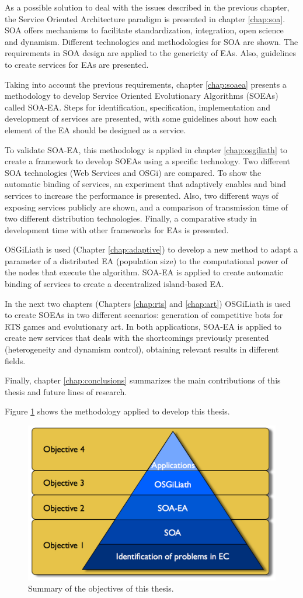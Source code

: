  As a possible solution to deal with the issues described in the previous chapter, the Service Oriented Architecture paradigm is presented in chapter \ref{chap:soa}. SOA  offers mechanisms to facilitate standardization, integration, open science and dynamism. Different technologies and methodologies for SOA are shown. The requirements in SOA design are applied to the genericity of EAs. Also, guidelines to create services for EAs are presented.

Taking into account the previous requirements, chapter \ref{chap:soaea} presents a methodology to develop Service Oriented Evolutionary Algorithms (SOEAs) called SOA-EA. Steps for identification, specification, implementation and development of services are presented, with some guidelines about how each element of the EA should be designed as a service.

To validate SOA-EA, this methodology is applied in chapter \ref{chap:osgiliath} to create a framework to develop SOEAs using a specific technology. Two different SOA technologies (Web Services and OSGi) are compared. To show the automatic binding of services, an experiment that adaptively enables and bind services to increase the performance is presented. Also, two different ways of exposing services publicly are shown, and a comparison of transmission time of two different distribution technologies. Finally, a comparative study in development time with other frameworks for EAs is presented.

OSGiLiath is used (Chapter \ref{chap:adaptive}) to develop a new method to adapt a parameter of a distributed EA (population size) to the computational power of the nodes that execute the algorithm. SOA-EA is applied to create automatic binding of services to create a decentralized island-based EA.

In the next two chapters (Chapters \ref{chap:rts} and \ref{chap:art}) OSGiLiath is used to create SOEAs in two different scenarios: generation of competitive bots for RTS games and evolutionary art. In both applications, SOA-EA is applied to create new services that deals with the shortcomings previously presented (heterogeneity and dynamism control), obtaining relevant results in different fields.

Finally, chapter \ref{chap:conclusions} summarizes the main contributions of this thesis and future lines of research.

Figure \ref{fig:intro:piramid} shows the methodology applied to develop this thesis.

\begin{figure}
\centering
 \includegraphics[scale =0.3] {gfx/intro/tesispiramide.pdf}
\caption{Summary of the objectives of this thesis.}
\label{fig:intro:piramid}
\end{figure}

